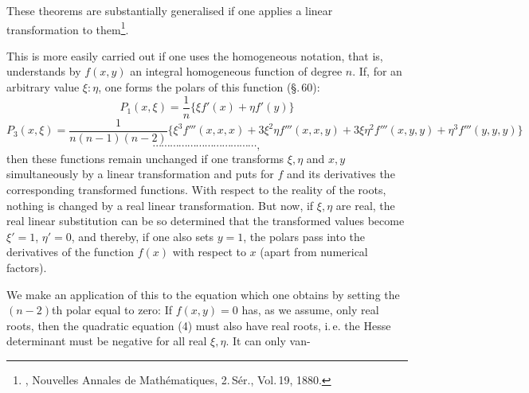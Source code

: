 These theorems are substantially generalised if one applies a linear
transformation to them\footnote{, Nouvelles
Annales de Math\'ematiques, 2.\,S\'er., Vol.\,19, 1880.}.

This is more easily carried out if one uses the homogeneous notation,
that is, understands by $f(x,y)$ an integral homogeneous function
of degree $n$. If, for an arbitrary value $\xi:\eta$, one forms the polars
of this function (\S.\,60):
\[
P_1(x,\xi) = \frac{1}{n}\{\xi f'(x) + \eta f'(y)\}
\]
\[
P_3(x,\xi) = \frac{1}{n(n-1)(n-2)}\{\xi^3 f'''(x,x,x) + 3\xi^2\eta f'''(x,x,y) + 3\xi\eta^2 f'''(x,y,y) + \eta^3 f'''(y,y,y)\}
\]
\[
\cdots\cdots\cdots\cdots\cdots\cdots\cdots\cdots\cdots\cdots\cdots\cdots,
\]
then these functions remain unchanged if one transforms $\xi, \eta$ and $x, y$
simultaneously by a linear transformation and puts for $f$ and
its derivatives the corresponding transformed functions. With
respect to the reality of the roots, nothing is changed by a real linear
transformation. But now, if $\xi, \eta$ are real,
the real linear substitution can be so determined that the transformed
values become $\xi' = 1$, $\eta' = 0$, and thereby, if one also sets
$y = 1$, the polars pass into the derivatives of the function $f(x)$ with respect to $x$
(apart from numerical factors).


We make an application of this to the equation which one obtains by
setting the $(n-2)$th polar equal to zero:
If $f(x,y) = 0$ has, as we assume, only real roots, then the
quadratic equation (4) must also have real roots, i.\,e. the
Hesse determinant
must be negative for all real $\xi, \eta$. It can only van-
